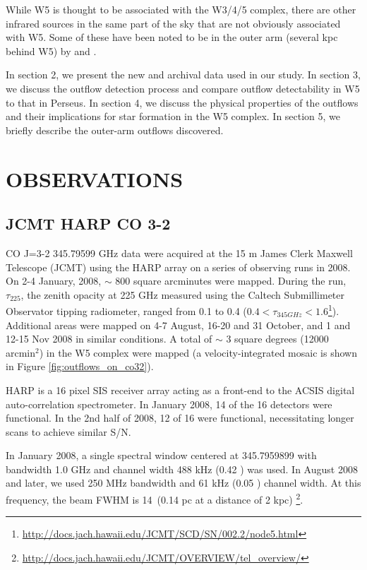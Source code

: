 While W5 is thought to be associated with the W3/4/5 complex, there are other
infrared sources in the same part of the sky that are not obviously associated
with W5.  Some of these have been noted to be in the outer arm (several kpc
behind W5) by \citet{Digel1996} and \citet{Snell2002}.

\par
\par In section 2, we present the new and archival data used in our study.  In
section 3, we discuss the outflow detection process and compare outflow
detectability in W5 to that in Perseus.  In section 4, we discuss the physical
properties of the outflows and their implications for star formation in the W5
complex.  In section 5, we briefly describe the outer-arm outflows discovered.

\section{OBSERVATIONS}
\subsection{JCMT HARP CO 3-2}
CO J=3-2 345.79599 GHz data were acquired at the 15 m James Clerk Maxwell
Telescope (JCMT) using the HARP array on a series of observing runs in 2008.
On 2-4 January, 2008, $\sim$ 800 square arcminutes were mapped.  During the
run, $\tau_{225}$, the zenith opacity at 225 GHz measured using the Caltech
Submillimeter Observator tipping radiometer, ranged from 0.1 to 0.4
($0.4<\tau_{345
GHz}<1.6$\footnote{\url{http://docs.jach.hawaii.edu/JCMT/SCD/SN/002.2/node5.html}}).
Additional areas were mapped on 4-7 August, 16-20 and 31 October, and 1 and
12-15 Nov 2008 in similar conditions.  A total of $\sim$ 3 square degrees (12000
arcmin$^2$) in the W5 complex were mapped (a velocity-integrated mosaic is
shown in Figure \ref{fig:outflows_on_co32}).

HARP is a 16 pixel SIS receiver array acting as a front-end to the ACSIS
digital auto-correlation spectrometer.  In January 2008, 14 of the 16 detectors
were functional.  In the 2nd half of 2008, 12 of 16 were functional,
necessitating longer scans to achieve similar S/N.

In January 2008, a single spectral window centered at 345.7959899 with bandwidth 1.0
GHz and channel width 488 kHz (0.42 \kms) was used.  In August 2008 and later, we used 250 MHz
bandwidth and 61 kHz (0.05 \kms) channel width.  At this frequency, the beam
FWHM is 14\arcsec\ (0.14 pc at a distance of 2 kpc)
\footnote{\url{http://docs.jach.hawaii.edu/JCMT/OVERVIEW/tel_overview/}}.

